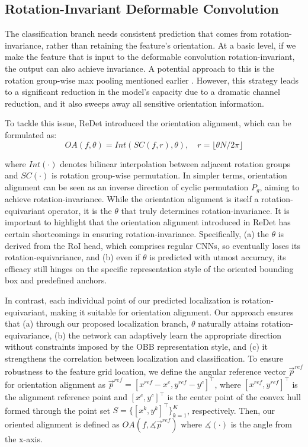 \documentclass[letterpaper]{article} %
\begin{document}
\subsection{Rotation-Invariant Deformable Convolution}
The classification branch needs consistent prediction that comes from rotation-invariance, rather than retaining the feature's orientation. At a basic level, if we make the feature that is input to the deformable convolution rotation-invariant, the output can also achieve invariance. A potential approach to this is the rotation group-wise max pooling mentioned earlier \citep{cohen2016group}. However, this strategy leads to a significant reduction in the model's capacity due to a dramatic channel reduction, and it also sweeps away all sensitive orientation information.

To tackle this issue, ReDet \citep{han2021ReDet} introduced the orientation alignment, which can be formulated as:
\begin{equation}
    OA(f, \theta) = \textit{Int}\left(SC(f, r), \theta\right), \quad r=\lfloor \theta N/2\pi \rfloor
\end{equation}

where $\textit{Int}(\cdot)$ denotes bilinear interpolation between adjacent rotation groups and \(SC(\cdot)\) is rotation group-wise permutation. In simpler terms, orientation alignment can be seen as an inverse direction of cyclic permutation \(P_g\), aiming to achieve rotation-invariance. While the orientation alignment is itself a rotation-equivariant operator, it is the \(\theta\) that truly determines rotation-invariance.  It is important to highlight that the orientation alignment introduced in ReDet has certain shortcomings in ensuring rotation-invariance. Specifically, (a) the \(\theta\) is derived from the RoI head, which comprises regular CNNs, so eventually loses its rotation-equivariance, and (b) even if 
\(\theta\) is predicted with utmost accuracy, its efficacy still hinges on the specific representation style of the oriented bounding box and predefined anchors.


In contrast, each individual point of our predicted localization is rotation-equivariant, making it suitable for orientation alignment. Our approach ensures that (a) through our proposed localization branch, \(\theta\) naturally attains rotation-equivariance, (b) the network can adaptively learn the appropriate direction without constraints imposed by the OBB representation style, and (c) it strengthens the correlation between localization and classification. To ensure robustness to the feature grid location, we define the angular reference vector \(\vec{p}^{ref}\) for orientation alignment as \(\vec{p}^{ref}=[x^{ref}-x^c,y^{ref}-y^c]^\top\), where  \([x^{ref}, y^{ref}]^\top\) is the alignment reference point and \([x^c, y^c]^\top\) is the center point of the convex hull formed through the point set \( S = \{[x^k, y^k]^\top\}_{k=1}^K \), respectively. Then, our oriented alignment is defined as
$OA(f, \measuredangle \vec{p}^{ref} )$ where $\measuredangle(\cdot)$ is the angle from the x-axis. 
\end{document}
